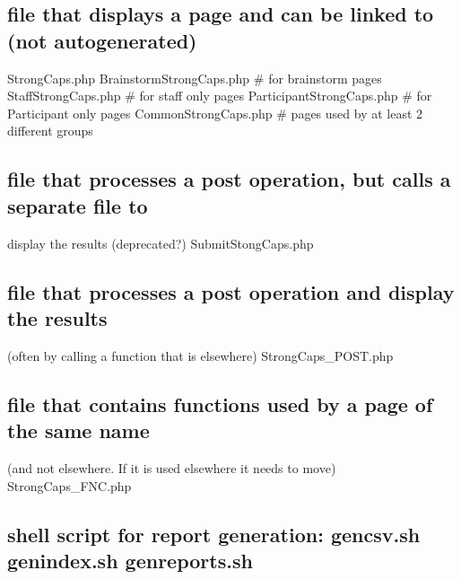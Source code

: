 \documentclass[tablesignature]{scrartcl}
\begin{document}
\subsection{file that displays a page and can be linked to  (not autogenerated)}
\label{sec-1_5}

   StrongCaps.php
   BrainstormStrongCaps.php    \# for brainstorm pages
   StaffStrongCaps.php    \# for staff only pages
   ParticipantStrongCaps.php    \# for Participant only pages
   CommonStrongCaps.php    \# pages used by at least 2 different groups
\subsection{file that processes a post operation, but calls a separate file to}
\label{sec-1_6}

   display the results (deprecated?)
   SubmitStongCaps.php
\subsection{file that processes a post operation and display the results}
\label{sec-1_7}

   (often by calling a function that is elsewhere)
   StrongCaps\_{}POST.php
\subsection{file that contains functions used by a page of the same name}
\label{sec-1_8}

   (and not elsewhere.   If it is used elsewhere it needs to move)
   StrongCaps\_{}FNC.php
\subsection{shell script for report generation: gencsv.sh genindex.sh genreports.sh}
\label{sec-1_9}
\end{document}
